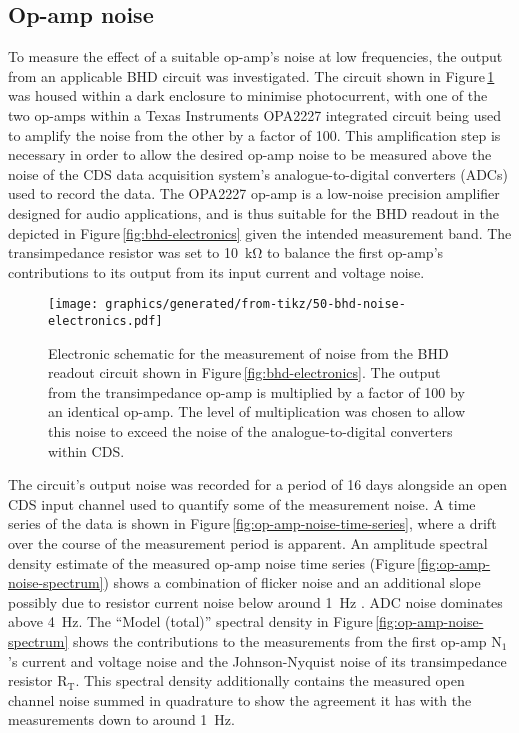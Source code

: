 \subsection{\label{sec:op-amp-noise}Op-amp noise}
To measure the effect of a suitable op-amp's noise at low frequencies, the output from an applicable \gls{BHD} circuit was investigated. The circuit shown in Figure\,\ref{fig:bhd-noise-electronics} was housed within a dark enclosure to minimise photocurrent, with one of the two op-amps within a Texas Instruments\textsuperscript{\textregistered} OPA2227 integrated circuit being used to amplify the noise from the other by a factor of \SI{100}{}. This amplification step is necessary in order to allow the desired op-amp noise to be measured above the noise of the \gls{CDS} data acquisition system's analogue-to-digital converters (\glspl{ADC}) used to record the data. The OPA2227 op-amp is a low-noise precision amplifier designed for audio applications, and is thus suitable for the \gls{BHD} readout in the \SSMEXPT{} depicted in Figure\,\ref{fig:bhd-electronics} given the intended measurement band. The transimpedance resistor was set to \SI{10}{\kilo\ohm} to balance the first op-amp's contributions to its output from its input current and voltage noise.

\begin{figure}
  \centering
  \texttt{[image: graphics/generated/from-tikz/50-bhd-noise-electronics.pdf]}
  \caption[Electronic schematic for the measurement of noise from the balanced homodyne readout]{\label{fig:bhd-noise-electronics}Electronic schematic for the measurement of noise from the BHD readout circuit shown in Figure\,\ref{fig:bhd-electronics}. The output from the transimpedance op-amp is multiplied by a factor of \num{100} by an identical op-amp. The level of multiplication was chosen to allow this noise to exceed the noise of the analogue-to-digital converters within \gls{CDS}.}
\end{figure}

The circuit's output noise was recorded for a period of \SI{16}{} days alongside an open \gls{CDS} input channel used to quantify some of the measurement noise. A time series of the data is shown in Figure\,\ref{fig:op-amp-noise-time-series}, where a drift over the course of the measurement period is apparent. An amplitude spectral density estimate of the measured op-amp noise time series (Figure\,\ref{fig:op-amp-noise-spectrum}) shows a combination of flicker noise and an additional slope possibly due to resistor current noise below around \SI{1}{\hertz} \cite{Seifert2009}. \gls{ADC} noise dominates above \SI{4}{\hertz}. The ``Model (total)'' spectral density in Figure\,\ref{fig:op-amp-noise-spectrum} shows the contributions to the measurements from the first op-amp $\textrm{N}_{1}$'s current and voltage noise and the Johnson-Nyquist noise of its transimpedance resistor $\textrm{R}_{\textrm{T}}$. This spectral density additionally contains the measured open channel noise summed in quadrature to show the agreement it has with the measurements down to around \SI{1}{\hertz}.

